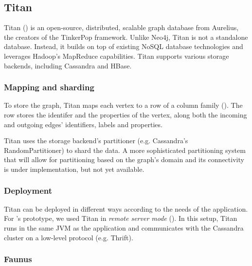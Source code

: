 
\subsection{Titan}

Titan () is an open-source, distributed, scalable graph database from Aurelius, the creators of the TinkerPop framework. Unlike Neo4j, Titan is not a standalone database. Instead, it builds on top of existing NoSQL database technologies and leverages Hadoop's MapReduce capabilities. Titan supports various storage backends, including Cassandra and HBase.


\subsubsection{Mapping and sharding}

To store the graph, Titan maps each vertex to a row of a column family (). The row stores the identifer and the properties of the vertex, along both the incoming and outgoing edges' identifiers, labels and properties.

Titan uses the storage backend's partitioner (e.g. Cassandra's RandomPartitioner) to shard the data. A more sophisticated partitioning system that will allow for partitioning based on the graph's domain and its connectivity is under implementation, but not yet available.


\subsubsection{Deployment}

Titan can be deployed in different ways according to the needs of the application. For \iqd's prototype, we used Titan in \textit{remote server mode} (). In this setup, Titan runs in the same JVM as the application and communicates with the Cassandra cluster on a low-level protocol (e.g. Thrift).


\subsubsection{Faunus}

